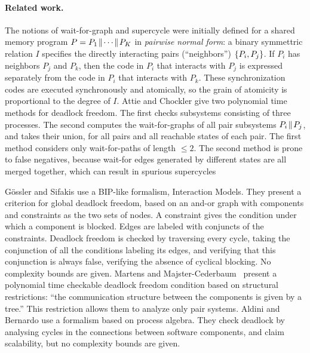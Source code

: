 
\paragraph{Related work.} 
The notions of wait-for-graph and supercycle \cite{AC05,AE98}
were initially defined for a shared memory program
$P = P_1 \!\parallel\! \cdots \!\parallel\! P_K$ in \emph{pairwise normal form}: a binary
symmettric relation $I$ specifies the directly interacting pairs
(``neighbors'') $\{ P_i, P_j \}$.
If $P_i$ has neighbors $P_j$ and $P_k$, then 
the code in $P_i$ that interacts with $P_j$ is expressed separately from
the code in $P_i$ that interacts with $P_k$. 
These synchronization codes are executed synchronously and
atomically, so the grain of atomicity is proportional to the
degree of $I$.
%
Attie and Chockler \cite{AC05} give two polynomial time 
methods for deadlock freedom.
The first checks subsystems consisting of three
processes. The second computes the wait-for-graphs of all pair subsystems $P_i \!\parallel\! P_j$,
and takes their union, for all pairs
and all reachable states of each pair.
The first method considers only wait-for-paths of length $\le 2$. 
The second method is prone to false negatives,
because wait-for edges generated by different states are
all merged together, which can result in spurious supercycles


G{\"o}ssler and Sifakis \cite{GS03} use a BIP-like
formalism, Interaction Models. %
They present a criterion for global deadlock freedom, based on 
an and-or graph with components and constraints as the two sets of nodes. A
constraint gives the condition
under which a component is blocked. Edges are labeled with conjuncts
of the constraints.  Deadlock freedom is checked by traversing every
cycle, taking the conjunction of all the
conditions labeling its edges, and verifying that this conjunction is
always false, \ie verifying the absence of cyclical blocking.
No complexity bounds are given.
%
Martens and Majster-Cederbaum~\cite{MM12} present a polynomial time
checkable deadlock freedom condition based on structural restrictions:
``the communication structure between the components is given by a
tree.'' This restriction allows them to analyze only pair systems.
%
Aldini and Bernardo \cite{AB03} use a 
formalism based on process algebra. They check deadlock by analysing cycles in
the connections between software components, and claim scalability, but no
complexity bounds are given.

